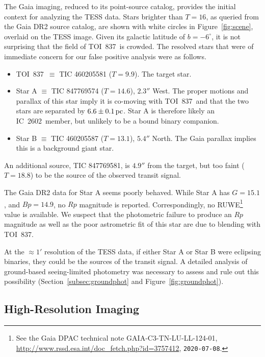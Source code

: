 \documentclass[12pt,twocolumn,tighten]{aastex63}
\newcommand{\tn}{TOI~837} %
\newcommand{\cn}{IC~2602} %
\begin{document}
The Gaia imaging, reduced to its point-source catalog, provides the
initial context for analyzing the TESS data.  Stars brighter than
$T=16$, as queried from the Gaia DR2 source catalog, are shown with
white circles in Figure~\ref{fig:scene}, overlaid on the TESS image.
Given its galactic latitude of $b=-6^\circ$, it is not surprising that
the field of \tn\ is crowded.  The resolved stars that were of
immediate concern for our false positive analysis were as follows.
\begin{itemize}
  \item \tn\ $\equiv$ TIC 460205581 ($T=9.9$). The target star.
  \item Star A $\equiv$ TIC 847769574 ($T=14.6$), $2.3''$ West. The
    proper motions and parallax of this star imply it is co-moving
    with \tn\ and that the two stars are separated by $6.6\pm
    0.1\,{\rm pc}$.  Star A is therefore likely an \cn\ member, but
    unlikely to be a bound binary companion.
  \item Star B $\equiv$ TIC 460205587 ($T=13.1$), $5.4''$ North.  The
    Gaia parallax implies this is a background giant star.
\end{itemize}
An additional source, TIC 847769581, is $4.9''$ from the target, but
too faint ($T=18.8$) to be the source of the observed transit signal.

The Gaia DR2 data for Star A seems poorly behaved.  While Star A has
$G=15.1$, and $Bp=14.9$, no $Rp$ magnitude is reported.
Correspondingly, no RUWE\footnote{ See the Gaia DPAC technical note
GAIA-C3-TN-LU-LL-124-01,
\url{http://www.rssd.esa.int/doc_fetch.php?id=3757412},
\texttt{2020-07-08}. } value is available.  We suspect that the
photometric failure to produce an $Rp$ magnitude as well as the poor
astrometric fit of this star are due to blending with \tn.

At the $\approx1'$ resolution of the TESS data, if either Star A or
Star B were eclipsing binaries, they could be the sources of the
transit signal.  A detailed analysis of ground-based seeing-limited
photometry was necessary to assess and rule out this possibility
(Section~\ref{subsec:groundphot} and Figure~\ref{fig:groundphot}).


\subsection{High-Resolution Imaging}
\label{subsec:speckle}
\end{document}

